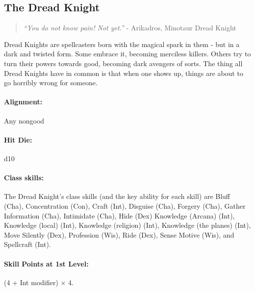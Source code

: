 \subsection[Dread Knight]{The Dread Knight}
\begin{quote}
\emph{``You do not know pain! Not yet.''}
- Arikadros, Minotaur Dread Knight
\end{quote}

Dread Knights are spellcasters born with the magical spark in them - but in a dark and twisted form. Some embrace it, becoming merciless killers.
Others try to turn their powers towards good, becoming dark avengers of sorts.
The thing all Dread Knights have in common is that when one shows up, things are about to go horribly wrong for someone.
\paragraph{Alignment:} Any nongood
\paragraph{Hit Die:} d10
\paragraph{Class skills:}
The Dread Knight's class skills (and the key ability for each skill) are Bluff (Cha), Concentration (Con), Craft (Int), Disguise (Cha), Forgery (Cha), Gather Information (Cha), Intimidate (Cha), Hide (Dex) Knowledge (Arcana) (Int), Knowledge (local) (Int), Knowledge (religion) (Int), Knowledge (the planes) (Int), Move Silently (Dex), Profession (Wis), Ride (Dex), Sense Motive (Wis), and Spellcraft (Int).

\paragraph{Skill Points at 1st Level:} (4 + Int modifier) $\times$ 4.
